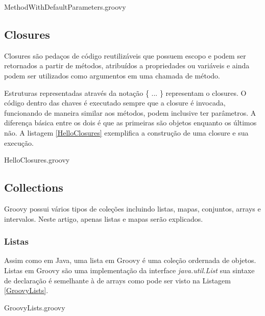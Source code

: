 \documentclass[12pt]{article}
\begin{document}
    
                    {MethodWithDefaultParameters.groovy}

\subsection{Closures}

    Closures são pedaços de código reutilizáveis que possuem escopo e podem ser 
    retornados a partir de métodos, atribuídos a propriedades ou variáveis e 
    ainda podem ser utilizados como argumentos em uma chamada de método. 
    
    Estruturas representadas através da notação \{ ... \} representam o closures.
    O código dentro das chaves é executado sempre que a closure é invocada, 
    funcionando de maneira similar aos métodos, podem inclusive ter parâmetros. 
    A diferença básica entre os dois é que as primeiras são objetos enquanto os 
    últimos não. A listagem \ref{HelloClosures} exemplifica a construção de uma 
    closure e sua execução.
    
    
                    {HelloClosures.groovy}
    
\subsection{Collections}

    Groovy possui vários tipos de coleções incluindo listas, mapas, conjuntos,
    arrays e intervalos. Neste artigo, apenas listas e mapas serão explicados.
    
\subsubsection{Listas}

    Assim como em Java, uma lista em Groovy é uma coleção ordernada de objetos.
    Listas em Groovy são uma implementação da interface \emph{java.util.List} sua 
    sintaxe de declaração é semelhante à de arrays como pode ser visto na 
    Listagem \ref{GroovyLists}.
    
    
                    {GroovyLists.groovy}
\end{document}
